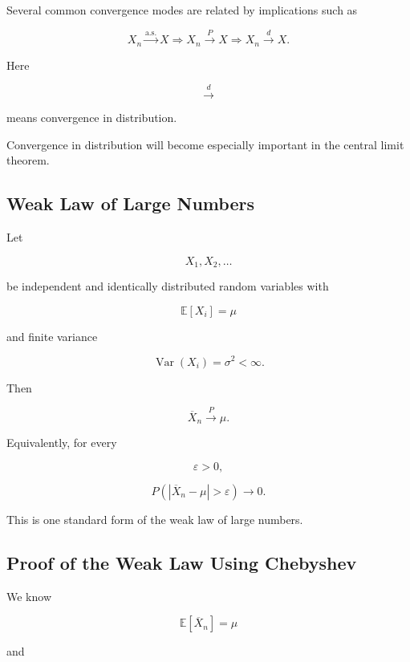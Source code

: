 Several common convergence modes are related by implications such as

\[
\boxed{
X_n\xrightarrow{\text{a.s.}}X
\Longrightarrow
X_n\xrightarrow{P}X
\Longrightarrow
X_n\xrightarrow{d}X.
}
\]

Here

\[
\xrightarrow{d}
\]

means convergence in distribution.

Convergence in distribution will become especially important in the
central limit theorem.

\subsection{Weak Law of Large Numbers}
\label{subsec:weak-law-large-numbers}

\begin{theorem}
Let

\[
X_1,X_2,\ldots
\]

be independent and identically distributed random variables with

\[
\mathbb{E}[X_i]=\mu
\]

and finite variance

\[
\operatorname{Var}(X_i)=\sigma^2<\infty.
\]

Then

\[
\boxed{
\overline{X}_n
\xrightarrow{P}
\mu.
}
\]

Equivalently, for every

\[
\varepsilon>0,
\]

\[
\boxed{
P
\left(
|\overline{X}_n-\mu|
>
\varepsilon
\right)
\to0.
}
\]
\end{theorem}

This is one standard form of the weak law of large numbers.

\subsection{Proof of the Weak Law Using Chebyshev}
\label{subsec:proof-weak-law-chebyshev}

We know

\[
\mathbb{E}[\overline{X}_n]
=
\mu
\]

and

